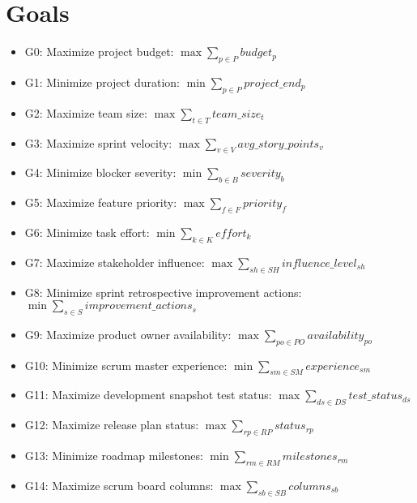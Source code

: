 \documentclass{article}
\begin{document}
\section{Goals}
\begin{itemize}
    \item G0: Maximize project budget: $\max \sum_{p \in P} budget_p$
    \item G1: Minimize project duration: $\min \sum_{p \in P} project\_end_p$
    \item G2: Maximize team size: $\max \sum_{t \in T} team\_size_t$
    \item G3: Maximize sprint velocity: $\max \sum_{v \in V} avg\_story\_points_v$
    \item G4: Minimize blocker severity: $\min \sum_{b \in B} severity_b$
    \item G5: Maximize feature priority: $\max \sum_{f \in F} priority_f$
    \item G6: Minimize task effort: $\min \sum_{k \in K} effort_k$
    \item G7: Maximize stakeholder influence: $\max \sum_{sh \in SH} influence\_level_{sh}$
    \item G8: Minimize sprint retrospective improvement actions: $\min \sum_{s \in S} improvement\_actions_s$
    \item G9: Maximize product owner availability: $\max \sum_{po \in PO} availability_{po}$
    \item G10: Minimize scrum master experience: $\min \sum_{sm \in SM} experience_{sm}$
    \item G11: Maximize development snapshot test status: $\max \sum_{ds \in DS} test\_status_{ds}$
    \item G12: Maximize release plan status: $\max \sum_{rp \in RP} status_{rp}$
    \item G13: Minimize roadmap milestones: $\min \sum_{rm \in RM} milestones_{rm}$
    \item G14: Maximize scrum board columns: $\max \sum_{sb \in SB} columns_{sb}$
\end{itemize}
\end{document}
